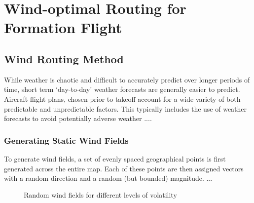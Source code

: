 \chapter{Wind-optimal Routing for Formation Flight}\label{chp:3}



	\section{Wind Routing Method}\label{sec:wind_method}	
		While weather is chaotic and difficult to accurately predict over longer periods of time, short term `day-to-day' weather forecasts are generally easier to predict. Aircraft flight plans, chosen prior to takeoff account for a wide variety of both predictable and unpredictable factors. This typically includes the use of weather forecasts to avoid potentially adverse weather ....

		\subsection{Generating Static Wind Fields}\label{sec:wind_fields}
			To generate wind fields, a set of evenly spaced geographical points is first generated across the entire map. Each of these points are then assigned vectors with a random direction and a random (but bounded) magnitude. 
			...
				\begin{figure}[ht]
				\centering
				\caption{Random wind fields for different levels of volatility}
					\label{fig:windfields}
				\end{figure}

